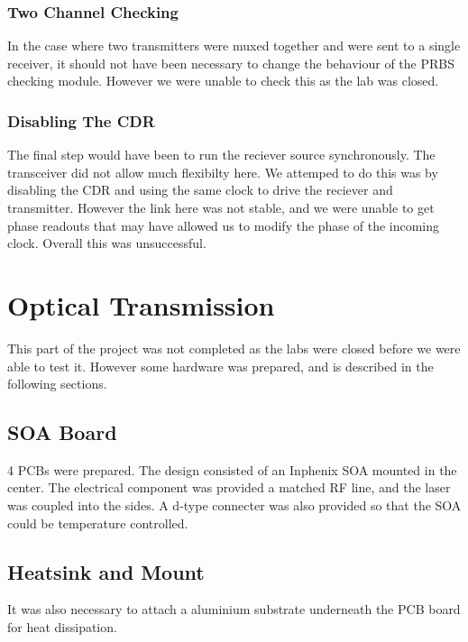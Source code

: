 \subsubsection{Two Channel Checking}%
\label{ssub:two_channel_checking}
In the case where two transmitters were muxed together and were sent to a
single receiver, it should not have been necessary to change the behaviour of
the PRBS checking module.
However we were unable to check this as the lab was closed.

\subsubsection{Disabling The CDR}%
\label{ssub:disabling_the_cdr}
The final step would have been to run the reciever source synchronously. The
transceiver did not allow much flexibilty here. We attemped to do this was by
disabling the CDR and using the same clock to drive the reciever and
transmitter. However the link here was not stable, and we were unable to get
phase readouts that may have allowed us to modify the phase of the incoming
clock. Overall this was unsuccessful.


\section{Optical Transmission}%
\label{optical_transmission}
This part of the project was not completed as the labs were closed before we
were able to test it. However some hardware was prepared, and is described in
the following sections.

\subsection{SOA Board}%
\label{sub:soa_board}
4 PCBs were prepared. The design consisted of an Inphenix SOA mounted in the
center. The electrical component was provided a matched RF line, and the laser
was coupled into the sides. A d-type connecter was also provided so that the
SOA could be temperature controlled.


\subsection{Heatsink and Mount}%
\label{sub:heatsink_and_mount}
It was also necessary to attach a aluminium substrate underneath the PCB board
for heat dissipation. 




